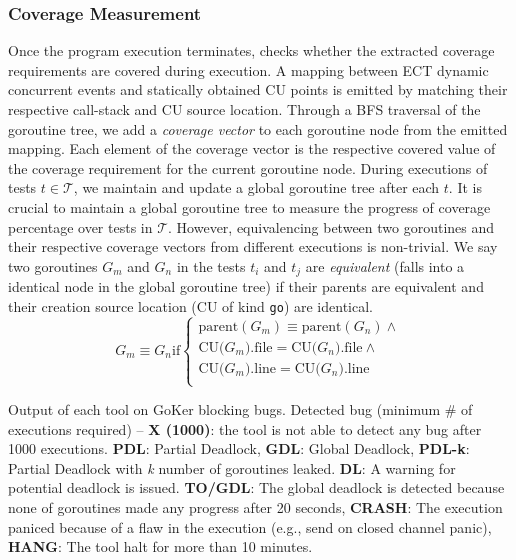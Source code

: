 \subsubsection{Coverage Measurement}
Once the program execution terminates, \goat checks whether the extracted coverage requirements are covered during execution.
%
A mapping between ECT dynamic concurrent events and statically obtained CU points is emitted by matching their respective call-stack and CU source location.
%
Through a BFS traversal of the goroutine tree, we add a \textit{coverage vector} to each goroutine node from the emitted mapping.
%
Each element of the coverage vector is the respective covered value of the coverage requirement for the current goroutine node.
%
During executions of tests $t \in \mathcal{T}$, we maintain and update a global goroutine tree after each $t$.
%
It is crucial to maintain a global goroutine tree to measure the progress of coverage percentage over tests in $\mathcal{T}$.
%
However, equivalencing between two goroutines and their respective coverage vectors from different executions is non-trivial.
%
We say two goroutines $G_m$ and $G_n$ in the tests $t_i$ and $t_j$ are \textit{equivalent} (\ie falls into a identical node in the global goroutine tree) if their parents are equivalent and their creation source location (CU of kind \texttt{go}) are identical.
%
\begin{equation}
  G_m \equiv G_n   \text{if}
  \begin{cases}
    \text{parent}(G_m) \equiv \text{parent}(G_n)  \wedge \\
    \text{CU(}G_m\text{).file} = \text{CU(}G_n\text{).file}  \wedge\\
    \text{CU(}G_m\text{).line} = \text{CU(}G_n\text{).line} \\
  \end{cases}
\end{equation}


\begin{table}[]
\caption{Output of each tool on GoKer \cite{yuan-gobench-cgo21} blocking bugs. Detected bug (minimum \# of executions required) -- \textbf{X (1000)}: the tool is not able to detect any bug after 1000 executions. \textbf{PDL}: Partial Deadlock, \textbf{GDL}: Global Deadlock, \textbf{PDL-k}: Partial Deadlock with \textit{k} number of goroutines leaked. \textbf{DL}: A warning for potential deadlock is issued. \textbf{TO/GDL}: The global deadlock is detected because none of goroutines made any progress after 20 seconds, \textbf{CRASH}: The execution paniced because of a flaw in the execution (e.g., send on closed channel panic), \textbf{HANG}: The tool halt for more than 10 minutes.}
\centering
\scalebox{0.47}{
    
  }
\label{tab:comparison}
\end{table}
